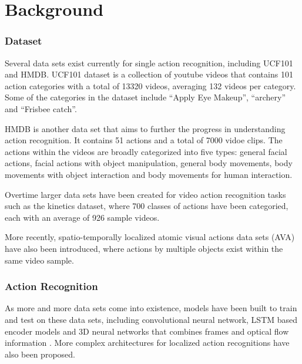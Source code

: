 \documentclass[
	a4paper, %
	10pt, %
	unnumberedsections, %
	twoside, %
]{t0004}
\begin{document}
\section{Background}

\subsubsection{Dataset} Several data sets exist currently for single action recognition, including UCF101\cite{Soomro:2012qr} and HMDB\cite{Kuehne11}. UCF101 dataset is a collection of youtube videos that contains 101 action categories with a total of 13320 videos, averaging 132 videos per category. Some of the categories in the dataset include ``Apply Eye Makeup'', ``archery'' and ``Frisbee catch''.

HMDB\cite{Kuehne11} is another data set that aims to further the progress in understanding action recognition.  It contains 51 actions and a total of 7000 vidoe clips. The actions within the videos are broadly categorized into five types: general facial actions, facial actions with object manipulation, general body movements, body movements with object interaction and body movements for human interaction.

Overtime larger data sets have been created for video action recognition tasks such as the kinetics dataset\cite{Smaira:2020qr}, where 700 classes of actions have been categoried, each with an average of 926 sample videos.

More recently, spatio-temporally localized atomic visual actions data sets (AVA)\cite{Gu:2018qr} have also been introduced, where actions by multiple objects exist within the same video sample.

\subsubsection{Action Recognition} As more and more data sets come into existence, models have been built to train and test on these data sets, including convolutional neural network, LSTM\cite{Carreira:2018qr} based encoder models and 3D neural networks that combines frames and optical flow information \cite{Carreira:2018qr}. More complex architectures for localized action recognitions have also been proposed\cite{Wu:2023qr}.
\end{document}
